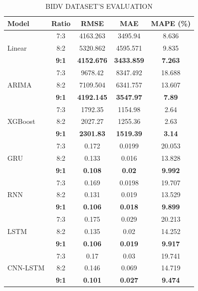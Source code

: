 \documentclass[conference]{IEEEtran}
\begin{document}
\begin{table}[h]
\centering
\caption{BIDV DATASET’S EVALUATION}
\begin{tabular}{lcccc}
\toprule
\textbf{Model} & \textbf{Ratio} & \textbf{RMSE} & \textbf{MAE} & \textbf{MAPE (\%)} \\ \midrule
\multirow{3}{*}{Linear} & 7:3 & 4163.263 & 3495.94 & 8.636 \\
                        & 8:2 & 5320.862 & 4595.571 & 9.835 \\
                        & \textbf{9:1} & \textbf{4152.676} & \textbf{3433.859} & \textbf{7.263} \\ \midrule
\multirow{3}{*}{ARIMA} & 7:3 & 9678.42 & 8347.492 & 18.688 \\
                        & 8:2 & 7109.504 & 6341.757 & 13.607 \\
                        & \textbf{9:1} & \textbf{4192.145} & \textbf{3547.97} & \textbf{7.89} \\ \midrule
\multirow{3}{*}{XGBoost} & 7:3 & 1792.35 & 1154.98 & 2.64 \\
                        & 8:2 & 2027.27 & 1255.36 & 2.63 \\
                        & \textbf{9:1} & \textbf{2301.83} & \textbf{1519.39} & \textbf{3.14} \\ \midrule
\multirow{3}{*}{GRU} & 7:3 & 0.172 & 0.0199 & 20.053 \\
                        & 8:2 & 0.133 & 0.016 & 13.828 \\
                        & \textbf{9:1} & \textbf{0.108} & \textbf{0.02} & \textbf{9.992} \\ \midrule
\multirow{3}{*}{RNN} & 7:3 & 0.169 & 0.0198 & 19.707 \\
                        & 8:2 & 0.131 & 0.019 & 13.529 \\
                        & \textbf{9:1} & \textbf{0.106} & \textbf{0.018} & \textbf{9.899} \\ \midrule
\multirow{3}{*}{LSTM} & 7:3 & 0.175 & 0.029 & 20.213 \\
                        & 8:2 & 0.135 & 0.02 & 14.252 \\
                        & \textbf{9:1} & \textbf{0.106} & \textbf{0.019} & \textbf{9.917} \\ \midrule
\multirow{3}{*}{CNN-LSTM} & 7:3 & 0.17 & 0.03 & 19.741 \\
                        & 8:2 & 0.146 & 0.069 & 14.719 \\
                        & \textbf{9:1} & \textbf{0.101} & \textbf{0.027} & \textbf{9.474} \\ \bottomrule
\end{tabular}
\end{table}
\end{document}
